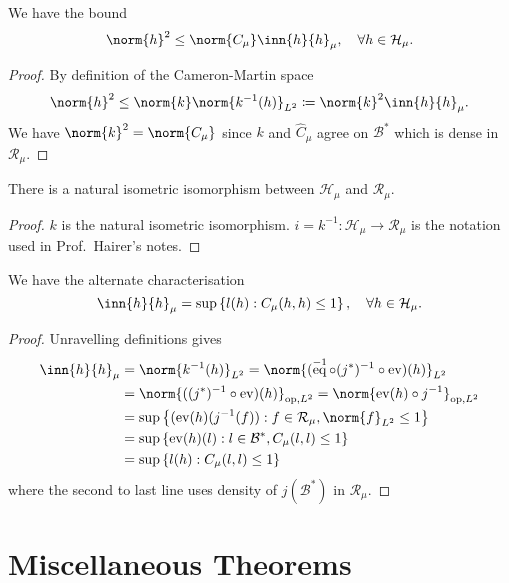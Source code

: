 \documentclass[fontsize=12pt, DIV=10]{scrreprt}
\theoremstyle{remark}
\newcommand{\defeq}{\coloneqq}
\newcommand{\op}{\text{op}}
\newcommand{\calB}{\mathcal B}
\newcommand{\calH}{\mathcal H}
\newcommand{\calR}{\mathcal R}
\DeclareMathOperator{\ev}{ev}
\DeclareMathOperator{\eq}{eq}
\begin{document}
\begin{corollary}
	We have the bound
	\begin{equation}
		\norm{h}^2 \leq \norm{C_{\mu}} \inn{h}{h}_{\mu}, \quad \forall h \in \calH_{\mu}.
	\end{equation}
\end{corollary}
\begin{proof}
	By definition of the Cameron-Martin space
	\begin{align}
		\norm{h}^2 \leq \norm{k} \norm{k^{-1}(h)}_{L^2}
		\defeq \norm{k}^2 \inn{h}{h}_{\mu}.
	\end{align}
	We have $\norm{k}^2 = \norm{C_{\mu}}$ since $k$ and $\hat{C}_{\mu}$ agree on $\calB^*$ which is dense in $\calR_{\mu}$.
\end{proof}
\begin{corollary}
	There is a natural isometric isomorphism between $\calH_{\mu}$ and $\calR_{\mu}$.
\end{corollary}
\begin{proof}
	$k$ is the natural isometric isomorphism. $i = k^{-1}: \calH_{\mu} \to \calR_{\mu}$ is the notation used in Prof.\ Hairer's notes.
\end{proof}
\begin{corollary}
	We have the alternate characterisation
	\begin{equation}
		\inn{h}{h}_{\mu} = \sup \left\{ l(h) : C_{\mu}(h, h) \leq 1\right\}, \quad \forall h \in \calH_{\mu}.
	\end{equation}
\end{corollary}
\begin{proof}
	Unravelling definitions gives
	\begin{align}
		\inn{h}{h}_{\mu}
		&= \norm{k^{-1}(h)}_{L^2}
		= \norm{(\eq^{-1} \circ (j^*)^{-1} \circ \ev)(h)}_{L^2} \\
		&= \norm{((j^*)^{-1} \circ \ev)(h)}_{\op, L^2}
		= \norm{\ev(h) \circ j^{-1}}_{\op, L^2} \\
		&= \sup \left\{ (\ev(h)(j^{-1}(f)) : f \in \calR_{\mu}, \norm{f}_{L^2} \leq 1\right\} \\
		&= \sup \left\{ \ev(h)(l) : l \in \calB^*, C_{\mu}(l, l) \leq 1\right\} \\
		&= \sup \left\{ l(h) : C_{\mu}(l, l) \leq 1\right\}
	\end{align}
	where the second to last line uses density of $j(\calB^*)$ in $\calR_{\mu}$.
\end{proof}



\chapter{Miscellaneous Theorems}
\end{document}
